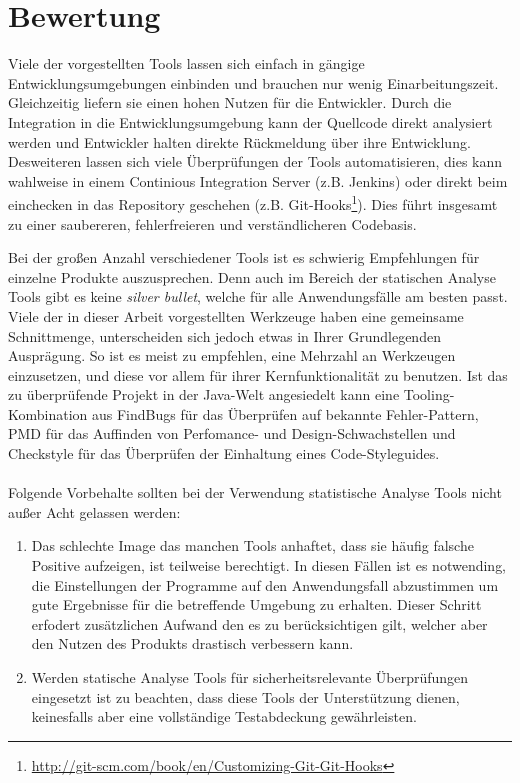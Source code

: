 \section{Bewertung}
Viele der vorgestellten Tools lassen sich einfach in gängige Entwicklungsumgebungen einbinden und brauchen nur wenig Einarbeitungszeit. Gleichzeitig liefern sie einen hohen Nutzen für die Entwickler. 
Durch die Integration in die Entwicklungsumgebung kann der Quellcode direkt analysiert werden und Entwickler halten direkte Rückmeldung über ihre Entwicklung. Desweiteren lassen sich viele Überprüfungen der Tools automatisieren, dies kann wahlweise in einem Continious Integration Server (z.B. Jenkins) oder direkt beim einchecken in das Repository geschehen (z.B. Git-Hooks\footnote{\url{http://git-scm.com/book/en/Customizing-Git-Git-Hooks}}). Dies führt insgesamt zu einer saubereren, fehlerfreieren und verständlicheren Codebasis.

Bei der großen Anzahl verschiedener Tools ist es schwierig Empfehlungen für einzelne Produkte auszusprechen. Denn auch im Bereich der statischen Analyse Tools gibt es keine \emph{silver bullet}, welche für alle Anwendungsfälle am besten passt. Viele der in dieser Arbeit vorgestellten Werkzeuge haben eine gemeinsame Schnittmenge, unterscheiden sich jedoch etwas in Ihrer Grundlegenden Ausprägung. So ist es meist zu empfehlen, eine Mehrzahl an Werkzeugen einzusetzen, und diese vor allem für ihrer Kernfunktionalität zu benutzen.
Ist das zu überprüfende Projekt in der Java-Welt angesiedelt kann eine Tooling-Kombination aus FindBugs für das Überprüfen auf bekannte Fehler-Pattern, PMD für das Auffinden von Perfomance- und Design-Schwachstellen und Checkstyle für das Überprüfen der Einhaltung eines Code-Styleguides.\\\\

Folgende Vorbehalte sollten bei der Verwendung statistische Analyse Tools nicht außer Acht gelassen werden:
\begin{enumerate}
  \item Das schlechte Image das manchen Tools anhaftet, dass sie häufig falsche Positive aufzeigen, ist teilweise berechtigt. In diesen Fällen ist es notwending, die Einstellungen der Programme auf den Anwendungsfall abzustimmen um gute Ergebnisse für die betreffende Umgebung zu erhalten. Dieser Schritt erfodert zusätzlichen Aufwand den es zu berücksichtigen gilt, welcher aber den Nutzen des Produkts drastisch verbessern kann.
  \item Werden statische Analyse Tools für sicherheitsrelevante Überprüfungen eingesetzt ist zu beachten, dass diese Tools der Unterstützung dienen, keinesfalls aber eine vollständige Testabdeckung gewährleisten.
\end{enumerate}

